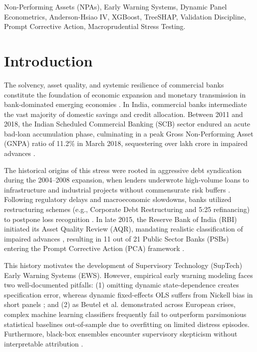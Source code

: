 \documentclass[conference]{IEEEtran}
\begin{document}
\begin{abstract}
\end{abstract}

\begin{IEEEkeywords}
Non-Performing Assets (NPAs), Early Warning Systems, Dynamic Panel Econometrics, Anderson-Hsiao IV, XGBoost, TreeSHAP, Validation Discipline, Prompt Corrective Action, Macroprudential Stress Testing.
\end{IEEEkeywords}

\section{Introduction}
The solvency, asset quality, and systemic resilience of commercial banks constitute the foundation of economic expansion and monetary transmission in bank-dominated emerging economies \cite{acharya2020, rbi_trend2024}. In India, commercial banks intermediate the vast majority of domestic savings and credit allocation. Between 2011 and 2018, the Indian Scheduled Commercial Banking (SCB) sector endured an acute bad-loan accumulation phase, culminating in a peak Gross Non-Performing Asset (GNPA) ratio of 11.2\% in March 2018, sequestering over  lakh crore in impaired advances \cite{acharya2020, rbi_trend2024}.

The historical origins of this stress were rooted in aggressive debt syndication during the 2004--2008 expansion, when lenders underwrote high-volume loans to infrastructure and industrial projects without commensurate risk buffers \cite{berger1997, rajan2018}. Following regulatory delays and macroeconomic slowdowns, banks utilized restructuring schemes (e.g., Corporate Debt Restructuring and 5:25 refinancing) to postpone loss recognition \cite{acharya2020, rajan2018}. In late 2015, the Reserve Bank of India (RBI) initiated its Asset Quality Review (AQR), mandating realistic classification of impaired advances \cite{rbi_pca2021, rajan2018}, resulting in 11 out of 21 Public Sector Banks (PSBs) entering the Prompt Corrective Action (PCA) framework \cite{acharya2020, rbi_pca2021}.

This history motivates the development of Supervisory Technology (SupTech) Early Warning Systems (EWS). However, empirical early warning modeling faces two well-documented pitfalls: (1) omitting dynamic state-dependence creates specification error, whereas dynamic fixed-effects OLS suffers from Nickell bias in short panels \cite{arellano1991, blundell1998}; and (2) as Beutel et al. \cite{beutel2019} demonstrated across European crises, complex machine learning classifiers frequently fail to outperform parsimonious statistical baselines out-of-sample due to overfitting on limited distress episodes. Furthermore, black-box ensembles encounter supervisory skepticism without interpretable attribution \cite{beutel2019, lundberg2020}.
\end{document}
